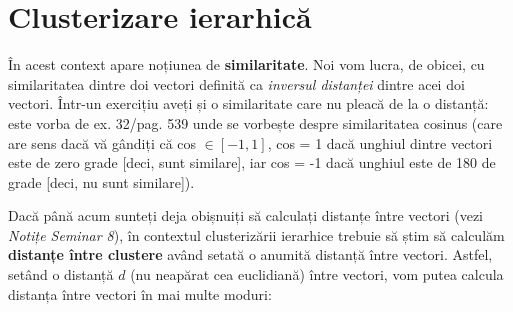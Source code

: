 \documentclass[12pt]{article}
\begin{document}
	\section{Clusterizare ierarhică}
	În acest context apare noțiunea de \textbf{similaritate}. Noi vom lucra, de obicei, cu similaritatea dintre doi vectori definită ca \textit{inversul distanței} dintre acei doi vectori. Într-un exercițiu aveți și o similaritate care nu pleacă de la o distanță: este vorba de ex. 32/pag. 539 unde se vorbește despre similaritatea cosinus (care are sens dacă vă gândiți că cos $\in [-1,1]$, cos = 1 dacă unghiul dintre vectori este de zero grade [deci, sunt similare], iar cos = -1 dacă unghiul este de 180 de grade [deci, nu sunt similare]).
	
	Dacă până acum sunteți deja obișnuiți să calculați distanțe între vectori (vezi \textit{Notițe Seminar 8}), în contextul clusterizării ierarhice trebuie să știm să calculăm \textbf{distanțe între clustere} având setată o anumită distanță între vectori. Astfel, setând o distanță $d$ (nu neapărat cea euclidiană) între vectori, vom putea calcula distanța între vectori în mai multe moduri:
\end{document}
